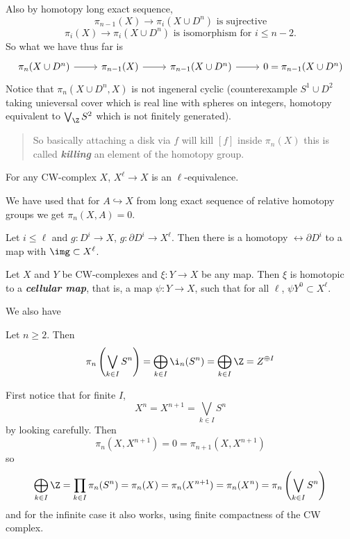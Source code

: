 \begin{remark}
Also by homotopy long exact sequence,
$$\pi_{n-1}(X)\to \pi_i(X\cup D^n)\text{ is sujrective}$$
$$\pi_i(X)\to \pi_{i}(X\cup D^n)\text{ is isomorphism for }i\leq n-2.$$
So what we have thus far is
$$\begin{tikzcd}
	\pi_n(X\cup D^n)\arrow[r]&\pi_{n-1}(X)\arrow[r]&\pi_{n-1}(X\cup D^n)\arrow[r]&0=\pi_{n-1}(X\cup D^n)
\end{tikzcd}$$
Notice that $\pi_n(X\cup D^n,X)$ is not ingeneral cyclic (counterexample $S^1\cup D^2$ taking unieversal cover which is real line with spheres on integers, homotopy equivalent to $\bigvee_\Z S^2$ which is not finitely generated).

\begin{quote}
	{\color{red} So basically attaching a disk via $f$ will kill $[f]$ inside $\pi_n(X)$ this is called \textbf{\textit{killing}} an element of the homotopy group.}
\end{quote}

\begin{prop}
	For any CW-complex $X$, $X^\ell\to X$ is an $\ell$-equivalence.
\end{prop}

\begin{remark}
	We have used that for $A\hookrightarrow X$ from long exact sequence of relative homotopy groups we get $\pi_n(X,A)=0$.
\end{remark}

\begin{coro}
	Let $i\leq \ell$ and $g: D^i\to X$, $g:\partial D^i\to X^\ell$. Then there is a homotopy $\rel\partial D^i$ to a map with $\img\subset X^\ell$.
\end{coro}

\begin{thm}
	Let $X$ and $Y$ be CW-complexes and $\xi:Y\to X$ be any map. Then $\xi$ is homotopic to a \textbf{\textit{cellular map}}, that is, a map $\psi:Y\to X$, such that for all $\ell$, $\psi Y^0\subset X^\ell$.
\end{thm}

We also have
\begin{prop}
	Let $n\geq 2$. Then 
	$$\pi_n\left(\bigvee_{k\in I}S^n\right)=\bigoplus_{k\in I}\i_n(S^n)=\bigoplus_{k\in I}\Z=Z^{\oplus I}$$
\end{prop}
\begin{prop}
	First notice that for finite $I$,
	$$X^n=X^{n+1}=\bigvee_{k\in I}S^n$$
	by looking carefully. Then
	$$\pi_n(X,X^{n+1})=0=\pi_{n+1}(X,X^{n+1})$$
	so
	$$\bigoplus_{k\in I}\Z=\prod_{k\in I}\pi_n(S^n)=\pi_n(X)=\pi_n(X^{n+1})=\pi_n(X^n)=\pi_n\left(\bigvee_{k\in I}S^n\right)$$
	and for the infinite case it also works, using finite compactness of the CW complex.
\end{prop}


\end{remark}
